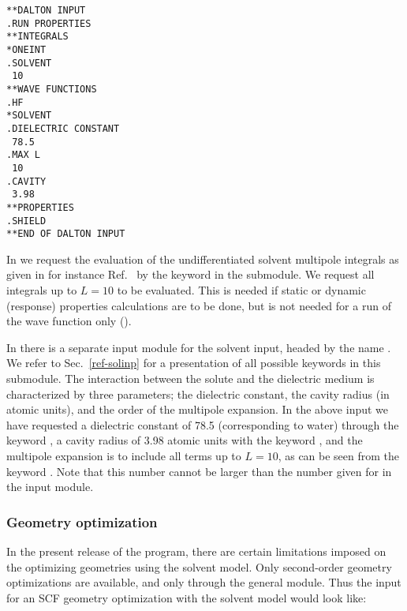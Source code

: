 \begin{verbatim}
**DALTON INPUT
.RUN PROPERTIES
**INTEGRALS
*ONEINT
.SOLVENT
 10
**WAVE FUNCTIONS
.HF
*SOLVENT
.DIELECTRIC CONSTANT
 78.5
.MAX L
 10
.CAVITY
 3.98
**PROPERTIES
.SHIELD
**END OF DALTON INPUT
\end{verbatim}

In  we request the evaluation of the undifferentiated solvent
multipole integrals as given in for instance
Ref.~\cite{kvmhahjajthjcp89} by the keyword  in the
 submodule. We request all
integrals up to $L=10$ to be evaluated. This is needed if static or
dynamic (response) properties
calculations are to be done, but is not needed for a run of the
wave function only ().

In  there is a separate input module for the
solvent input,
headed by the name . We refer to Sec.~\ref{ref-solinp}
for a presentation of all possible keywords in this submodule. The
interaction between the solute and the dielectric
medium is
characterized by three parameters; the dielectric
constant, the cavity
radius (in atomic units), and the order of the multipole
expansion. In the above input we have
requested a dielectric constant of 78.5 (corresponding to water)
through the keyword , a cavity radius of 3.98 atomic
units with the keyword , and the multipole expansion is to
include all terms up to $L=10$, as can be seen from the keyword
. Note that this number cannot be larger than the number given for
 in the  input module.

\subsubsection{Geometry optimization}\label{sec:solventgeoopt}

In the present release of the {\dalton} program, there are certain
limitations imposed on the optimizing geometries using the solvent
model. Only second-order geometry optimizations
are available, and only through the general  module. 
Thus the input for an SCF geometry optimization with the solvent model
would look like:

